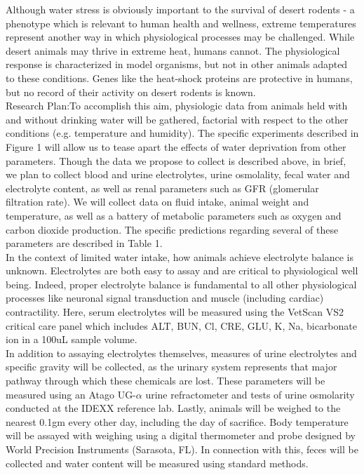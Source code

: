 Although water stress is obviously important to the survival of desert rodents - a phenotype which is relevant to human health and wellness, extreme temperatures represent another way in which physiological processes may be challenged. While desert animals may thrive in extreme heat, humans cannot. The physiological response is characterized in model organisms, but not in other animals adapted to these conditions. Genes like the heat-shock proteins are protective in humans, but no record of their activity on desert rodents is known. \\

Research Plan:To accomplish this aim, physiologic data from animals held with and without drinking water will be gathered, factorial with respect to the other conditions (e.g. temperature and humidity). The specific experiments described in \hypertarget{Figure 1}{Figure 1} will allow us to tease apart the effects of water deprivation from other parameters. Though the data we propose to collect is described above, in brief, we plan to collect blood and urine electrolytes, urine osmolality, fecal water and electrolyte content, as well as renal parameters such as GFR (glomerular filtration rate). We will collect data on fluid intake, animal weight and temperature, as well as a battery of metabolic parameters such as oxygen and carbon dioxide production. The specific predictions regarding several of these parameters are described in Table 1.  \\

In the context of limited water intake, how animals achieve electrolyte balance is unknown. Electrolytes are both easy to assay and are critical to physiological well being. Indeed, proper electrolyte balance is fundamental to all other physiological processes like neuronal signal transduction and muscle (including cardiac) contractility. Here, serum electrolytes will be measured using the VetScan VS2 critical care panel which includes ALT, BUN, Cl, CRE, GLU, K, Na, bicarbonate ion in a 100uL sample volume. \\

In addition to assaying electrolytes themselves, measures of urine electrolytes and specific gravity will be collected, as the urinary system represents that major pathway through which these chemicals are lost. These parameters will be measured using an Atago UG-$\alpha$ urine refractometer and tests of urine osmolarity conducted at the IDEXX reference lab. Lastly, animals will be weighed to the nearest 0.1gm every other day, including the day of sacrifice. Body temperature will be assayed with weighing using a digital thermometer and probe designed by World Precision Instruments (Sarasota, FL). In connection with this, feces will be collected and water content will be measured using standard methods. \\

